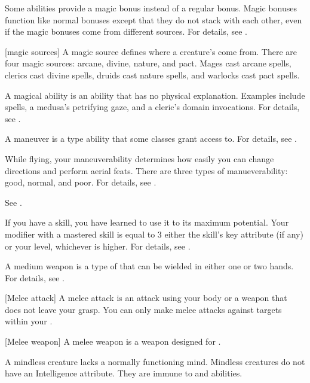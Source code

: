  Some abilities provide a magic bonus instead of a regular bonus.
Magic bonuses function like normal bonuses except that they do not stack with each other, even if the magic bonuses come from different sources.
For details, see .

[magic sources] A magic source defines where a creature's  come from.
There are four magic sources: arcane, divine, nature, and pact.
Mages cast arcane spells, clerics cast divine spells, druids cast nature spells, and warlocks cast pact spells.

 A magical ability is an ability that has no physical explanation.
Examples include spells, a medusa's petrifying gaze, and a cleric's domain invocations.
For details, see .

 A maneuver is a type  ability that some classes grant access to.
For details, see .

 While flying, your maneuverability determines how easily you can change directions and perform aerial feats.
There are three types of manueverability: good, normal, and poor.
For details, see .

 See .

 If you have  a skill, you have learned to use it to its maximum potential.
Your modifier with a mastered skill is equal to 3 \add either the skill's key attribute (if any) or your level, whichever is higher.
For details, see .

 A medium weapon is a type of  that can be wielded in either one or two hands.
For details, see .

[Melee attack] A melee attack is an attack using your body or a weapon that does not leave your grasp.
You can only make melee attacks against targets within your .

[Melee weapon] A melee weapon is a weapon designed for .

 A mindless creature lacks a normally functioning mind.
Mindless creatures do not have an Intelligence attribute.
They are immune to  and  abilities.

